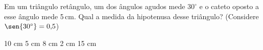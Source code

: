Em um triângulo retângulo, um dos ângulos agudos mede $30^\circ$ e o cateto oposto a esse ângulo mede 5\,cm. Qual a medida da hipotenusa desse triângulo? (Considere $\sen{30^\circ} = 0{,}5$)

\parbox{\linewidth}{

10 cm
5 cm
8 cm
2 cm
15 cm

}




